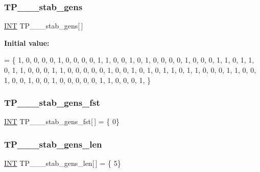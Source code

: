\mbox{\label{data___t_p_8_c_afb87a7cda11196047b1b7b71cb6171dd}} 
\subsubsection{\texorpdfstring{T\+P\+\_\+\_\+\_\+stab\+\_\+gens}{TP\_2\_2\_stab\_gens}}
{\footnotesize\ttfamily \mbox{\hyperlink{galois_8h_a09fddde158a3a20bd2dcadb609de11dc}{I\+NT}} T\+P\+\_\+\_\+\_\+stab\+\_\+gens\mbox{[}$\,$\mbox{]}}

{\bfseries Initial value\+:}
\begin{DoxyCode}
= \{
1, 0, 0, 0, 0, 1, 0, 0, 0, 0, 1, 1, 0, 0, 1, 0, 
1, 0, 0, 0, 0, 1, 0, 0, 0, 1, 1, 0, 1, 1, 0, 1, 
1, 0, 0, 0, 1, 1, 0, 0, 0, 0, 0, 1, 0, 0, 1, 0, 
1, 0, 1, 1, 0, 1, 1, 0, 0, 0, 1, 1, 0, 0, 1, 0, 
0, 1, 0, 0, 1, 0, 0, 0, 0, 0, 1, 1, 0, 0, 0, 1, 
\}
\end{DoxyCode}
\mbox{\label{data___t_p_8_c_ab4843e9a89c7cf8e59b795929970ef6c}} 
\subsubsection{\texorpdfstring{T\+P\+\_\+\_\+\_\+stab\+\_\+gens\+\_\+fst}{TP\_2\_2\_stab\_gens\_fst}}
{\footnotesize\ttfamily \mbox{\hyperlink{galois_8h_a09fddde158a3a20bd2dcadb609de11dc}{I\+NT}} T\+P\+\_\+\_\+\_\+stab\+\_\+gens\+\_\+fst\mbox{[}$\,$\mbox{]} = \{ 0\}}

\mbox{\label{data___t_p_8_c_a23057244dd993295cd3f2ef52cad9c96}} 
\subsubsection{\texorpdfstring{T\+P\+\_\+\_\+\_\+stab\+\_\+gens\+\_\+len}{TP\_2\_2\_stab\_gens\_len}}
{\footnotesize\ttfamily \mbox{\hyperlink{galois_8h_a09fddde158a3a20bd2dcadb609de11dc}{I\+NT}} T\+P\+\_\+\_\+\_\+stab\+\_\+gens\+\_\+len\mbox{[}$\,$\mbox{]} = \{ 5\}}

